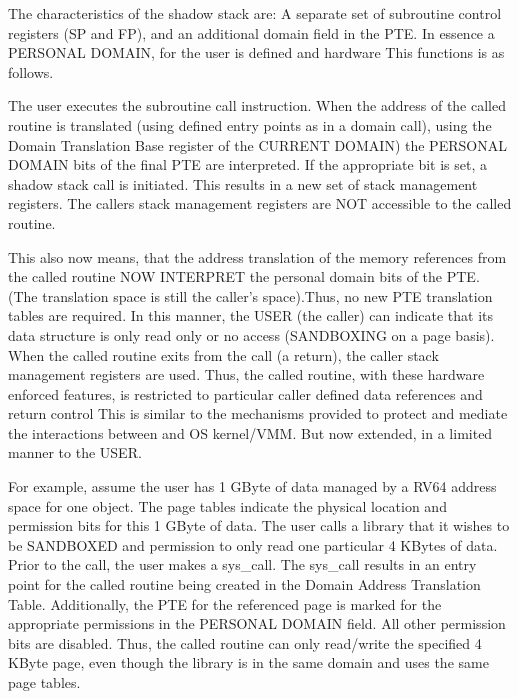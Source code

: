 \documentclass{article}
\begin{document}
The characteristics of the shadow stack are:  A separate set of subroutine control registers (SP and FP),  and an additional domain field in the PTE.  In essence a PERSONAL DOMAIN, for the user is defined and hardware  This functions is as follows.

The user executes the subroutine call instruction.  When the address of the called routine is translated (using defined entry points as in a domain call), using the Domain Translation Base register of the CURRENT DOMAIN)  the PERSONAL DOMAIN bits of the final PTE are interpreted. If the appropriate bit is set,     a shadow stack call is initiated. This results in a new set of stack management registers.  The callers stack management registers are NOT  accessible to the called routine.

This also now means,  that the  address translation of the memory references from the called routine  NOW INTERPRET  the personal domain bits of the PTE.  (The translation space is still the caller’s space).Thus, no new PTE translation tables are required.   In this manner, the USER (the caller) can indicate that its data structure is only read only or no access (SANDBOXING on a page basis).  When the called routine exits from the call (a return),  the caller stack management registers are used.  Thus, the called routine, with these hardware enforced features,   is restricted to particular caller defined data references and return control This is similar to the mechanisms provided to protect and mediate the interactions between and OS kernel/VMM.  But now extended,  in a limited manner to the USER.




For example,  assume the user has 1 GByte of data managed by a RV64 address space for one object.   The page tables indicate the physical location and permission bits for this 1 GByte of data.  The user calls a library that it wishes to be SANDBOXED and permission to only read one particular 4 KBytes of data.   Prior to the call,  the user makes a sys\_call.  The sys\_call results in an entry point for the called routine being created in the Domain Address Translation Table.  Additionally, the PTE for the referenced page is marked for the appropriate permissions in the PERSONAL DOMAIN field. All other permission bits are disabled.  Thus, the called routine can only read/write the specified 4 KByte page,  even though the library is in the same domain and uses the same page tables.
\end{document}
